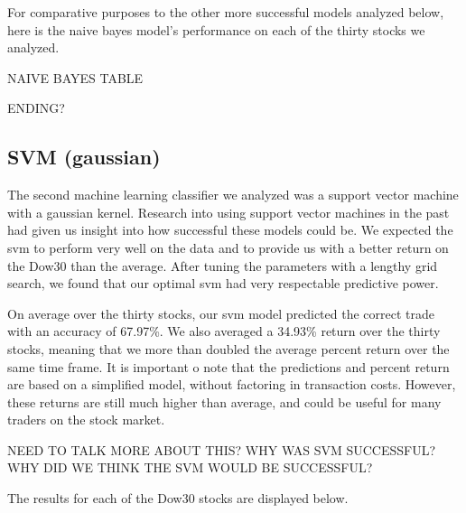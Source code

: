 \documentclass{article}
\begin{document}
For comparative purposes to the other more successful models analyzed below, here is the naive bayes model's performance on each of the thirty stocks we analyzed.

NAIVE BAYES TABLE

ENDING?

\subsection{SVM (gaussian)}
The second machine learning classifier we analyzed was a support vector machine with a gaussian kernel. Research into using support vector machines in the past had given us insight into how successful these models could be. We expected the svm to perform very well on the data and to provide us with a better return on the Dow30 than the average. After tuning the parameters with a lengthy grid search, we found that our optimal svm had very respectable predictive power.

On average over the thirty stocks, our svm model predicted the correct trade with an accuracy of 67.97\%. We also averaged a 34.93\% return over the thirty stocks, meaning that we more than doubled the average percent return over the same time frame. It is important o note that the predictions and percent return are based on a simplified model, without factoring in transaction costs. However, these returns are still much higher than average, and could be useful for many traders on the stock market.

NEED TO TALK MORE ABOUT THIS? WHY WAS SVM SUCCESSFUL? WHY DID WE THINK THE SVM WOULD BE SUCCESSFUL?

The results for each of the Dow30 stocks are displayed below.
\end{document}
